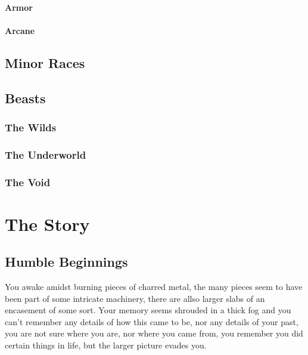 \documentclass[a4paper,10pt]{book}
\begin{document}


\subsection{Armor}
\subsection{Arcane}
\chapter{Minor Races}
\chapter{Beasts}
\section{The Wilds}
\section{The Underworld}
\section{The Void}

\part{The Story}
\chapter{Humble Beginnings}
You awake amidst burning pieces of charred metal, the many pieces
seem to have been part of some intricate machinery, there are allso larger
slabs of an encasement of some sort. Your memory seems shrouded in a thick fog
and you can't remember any details of how this came to be, nor any details of 
your past, you are not sure where you are, nor where you came from, you remember
you did certain things in life, but the larger picture evades you.
\end{document}
